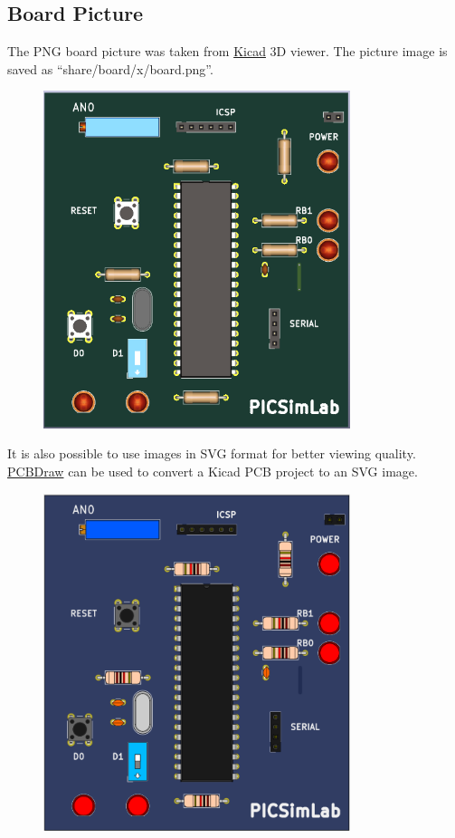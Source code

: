 \pagebreak
\subsection{Board Picture}

The PNG board picture was taken from \href{http://kicad-pcb.org/}{Kicad} 3D viewer.
The picture image is saved as ``share/board/x/board.png''.

\begin{figure}[H]
\center
\includegraphics[width=0.8\textwidth]{files/share/board.png} 
\end{figure} 

It is also possible to use images in SVG format for better viewing quality. \href{https://github.com/yaqwsx/PcbDraw}{PCBDraw} can be used to convert a Kicad PCB project to 
an SVG image. 

\begin{figure}[H]
\center
\includegraphics[width=0.8\textwidth]{files/share/board_svg.png} 
\end{figure} 

